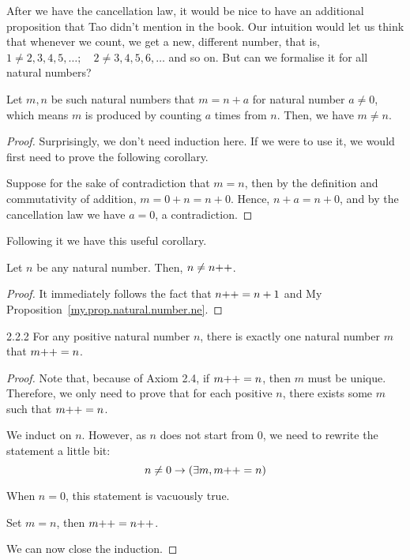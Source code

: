 After we have the cancellation law, it would be nice to have an additional proposition that Tao didn't mention in the book. Our intuition would let us think that whenever we count, we get a new, different number, that is, $1\ne 2,3,4,5,\dots;\quad 2\ne 3,4,5,6,\dots$ and so on. But can we formalise it for all natural numbers?
\begin{prop}\label{my.prop.natural.number.ne}
Let $m,n$ be such natural numbers that $m=n+a$ for natural number $a\ne 0$, which means $m$ is produced by counting $a$ times from $n$. Then, we have $m \ne n$.
\end{prop}
\begin{proof}
Surprisingly, we don't need induction here. If we were to use it, we would first need to prove the following corollary.

Suppose for the sake of contradiction that $m=n$, then by the definition and commutativity of addition, $m=0+n=n+0$. Hence, $n+a=n+0$, and by the cancellation law we have $a=0$, a contradiction.
\end{proof}

Following it we have this useful corollary.
\begin{coro}
Let $n$ be any natural number. Then, $n\ne n{+}{+}$.
\end{coro}

\begin{proof}
It immediately follows the fact that $n{+}{+} = n+1$ and My Proposition~\ref{my.prop.natural.number.ne}.
\end{proof}

\begin{exercise}{2.2.2}
For any positive natural number $n$, there is exactly one natural number $m$ that $m{+}{+} = n$. 
\end{exercise}

\begin{proof}
Note that, because of Axiom 2.4, if $m{+}{+} = n$, then $m$ must be unique. Therefore, we only need to prove that for each positive $n$, there exists some $m$ such that $m{+}{+} = n$.
	
We induct on $n$. However, as $n$ does not start from $0$, we need to rewrite the statement a little bit:
$$
n \ne 0 \to (\exists m, m{+}{+} = n)
$$

\mybcbox When $n = 0$, this statement is vacuously true.

\myisbox Set $m=n$, then $m{+}{+} = n{+}{+}$.

We can now close the induction.
\end{proof}

